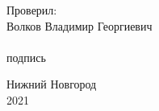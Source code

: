 \begin{titlepage}
\begin{minipage}[t]{.36\linewidth}
\begin{flushleft}
			\vspace{1.5em}
			Проверил:\\
			Волков Владимир Георгиевич\\
			\vspace{1.0em}
			\hrulefill \\
			{\small подпись}

    	\end{flushleft}
    \end{minipage}

	\vspace{\fill}

	\begin{center}
		Нижний Новгород \\
		2021
	\end{center}

\end{titlepage}